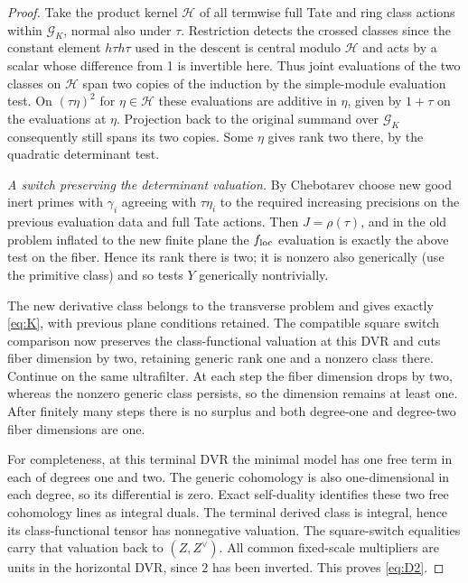 \begin{proof}
Take the product kernel \(\mathcal H\) of all termwise full Tate and ring class actions within \(\mathcal G_K\), normal also under \(\tau\). Restriction detects the crossed classes since the constant element \(h\tau h\tau\) used in the descent is central modulo \(\mathcal H\) and acts by a scalar whose difference from 1 is invertible here. Thus joint evaluations of the two classes on \(\mathcal H\) span two copies of the induction by the simple-module evaluation test. On \((\tau\eta)^2\) for \(\eta\in\mathcal H\) these evaluations are additive in \(\eta\), given by \(1+\tau\) on the evaluations at \(\eta\). Projection back to the original summand over \(\mathcal G_K\) consequently still spans its two copies. Some \(\eta\) gives rank two there, by the quadratic determinant test.

\smallskip\noindent\emph{A switch preserving the determinant valuation.}
By Chebotarev choose new good inert primes with \(\gamma_i\) agreeing with \(\tau\eta_i\) to the required increasing precisions on the previous evaluation data and full Tate actions. Then \(J=\rho(\tau)\), and in the old problem inflated to the new finite plane the \(f_{\rm loc}\) evaluation is exactly the above test on the fiber. Hence its rank there is two; it is nonzero also generically (use the primitive class) and so tests \(Y\) generically nontrivially.

The new derivative class belongs to the transverse problem and gives exactly \eqref{eq:K}, with previous plane conditions retained. The compatible square switch comparison now preserves the class-functional valuation at this DVR and cuts fiber dimension by two, retaining generic rank one and a nonzero class there. Continue on the same ultrafilter. At each step the fiber dimension drops by two, whereas the nonzero generic class persists, so the dimension remains at least one. After finitely many steps there is no surplus and both degree-one and degree-two fiber dimensions are one.

For completeness, at this terminal DVR the minimal model has one free term in each of degrees one and two. The generic cohomology is also one-dimensional in each degree, so its differential is zero. Exact self-duality identifies these two free cohomology lines as integral duals. The terminal derived class is integral, hence its class-functional tensor has nonnegative valuation. The square-switch equalities carry that valuation back to \((Z,Z^\vee)\). All common fixed-scale multipliers are units in the horizontal DVR, since \(2\) has been inverted. This proves \eqref{eq:D2}.
\end{proof}

